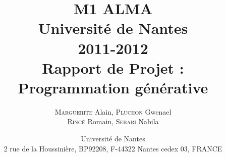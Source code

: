 \documentclass[11pt,a4paper,utf8x]{report}
\title
{
	\normalsize{ M1 ALMA\\ 
	Université de Nantes\\
	2011-2012}\\
	\vspace{15mm}
	\Huge{Rapport de Projet :\\Programmation générative }
}
\author{\textsc{Marguerite} Alain, \textsc{Pluchon} Gwenael\\ \textsc{Rincé} Romain, \textsc{Sebari} Nabila
	\vspace{45mm}
}
\date
{	
	\normalsize{Université de Nantes \\ 2 rue de la Houssinière, BP92208, F-44322 Nantes cedex 03, FRANCE
	\\ 
	\vspace{5mm}	
	}
}
\begin{document}
\renewcommand{\labelitemi}{$\bullet$} 	
\maketitle


\clearpage

\tableofcontents
\clearpage

\begin{onehalfspace}







\end{onehalfspace}



\listoffigures

\printindex

\appendix



\end{document}
